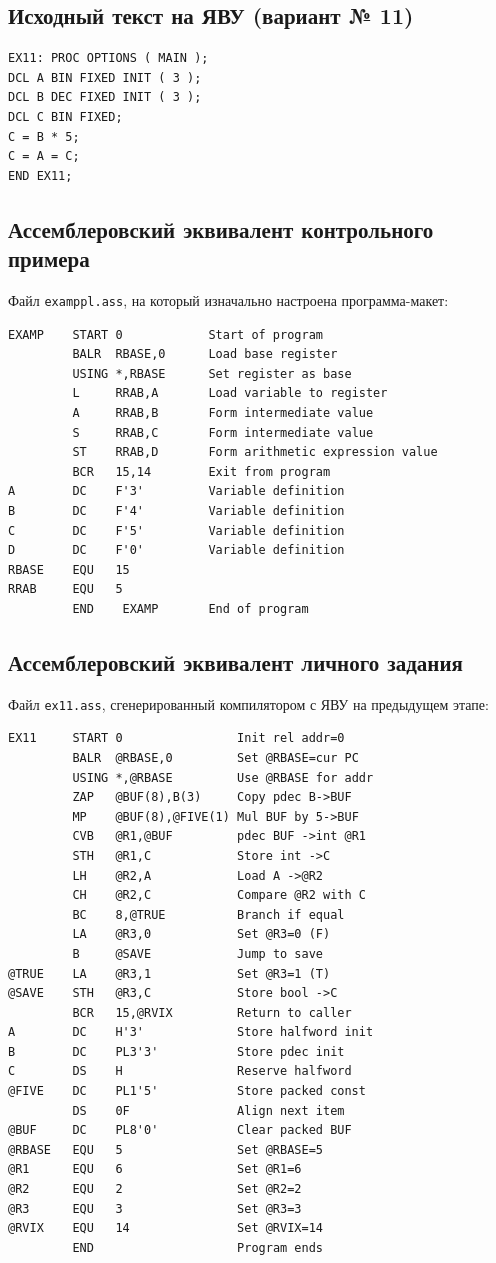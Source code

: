 \documentclass[12pt, a4paper]{article}
\begin{document}
\subsection{Исходный текст на ЯВУ (вариант № 11)}
\begin{lstlisting}[language=PL/I]
EX11: PROC OPTIONS ( MAIN );
DCL A BIN FIXED INIT ( 3 );
DCL B DEC FIXED INIT ( 3 );
DCL C BIN FIXED;
C = B * 5;
C = A = C;
END EX11;
\end{lstlisting}

\subsection{Ассемблеровский эквивалент контрольного примера}
Файл \texttt{examppl.ass}, на который изначально настроена программа-макет:
\begin{lstlisting}
EXAMP    START 0            Start of program
         BALR  RBASE,0      Load base register
         USING *,RBASE      Set register as base
         L     RRAB,A       Load variable to register
         A     RRAB,B       Form intermediate value
         S     RRAB,C       Form intermediate value
         ST    RRAB,D       Form arithmetic expression value
         BCR   15,14        Exit from program
A        DC    F'3'         Variable definition
B        DC    F'4'         Variable definition
C        DC    F'5'         Variable definition
D        DC    F'0'         Variable definition
RBASE    EQU   15
RRAB     EQU   5
         END    EXAMP       End of program
\end{lstlisting}

\subsection{Ассемблеровский эквивалент личного задания}
Файл \texttt{ex11.ass}, сгенерированный компилятором с ЯВУ на предыдущем этапе:
\begin{lstlisting}
EX11     START 0                Init rel addr=0
         BALR  @RBASE,0         Set @RBASE=cur PC
         USING *,@RBASE         Use @RBASE for addr
         ZAP   @BUF(8),B(3)     Copy pdec B->BUF
         MP    @BUF(8),@FIVE(1) Mul BUF by 5->BUF
         CVB   @R1,@BUF         pdec BUF ->int @R1
         STH   @R1,C            Store int ->C
         LH    @R2,A            Load A ->@R2
         CH    @R2,C            Compare @R2 with C
         BC    8,@TRUE          Branch if equal
         LA    @R3,0            Set @R3=0 (F)
         B     @SAVE            Jump to save
@TRUE    LA    @R3,1            Set @R3=1 (T)
@SAVE    STH   @R3,C            Store bool ->C
         BCR   15,@RVIX         Return to caller
A        DC    H'3'             Store halfword init
B        DC    PL3'3'           Store pdec init
C        DS    H                Reserve halfword
@FIVE    DC    PL1'5'           Store packed const
         DS    0F               Align next item
@BUF     DC    PL8'0'           Clear packed BUF
@RBASE   EQU   5                Set @RBASE=5
@R1      EQU   6                Set @R1=6
@R2      EQU   2                Set @R2=2
@R3      EQU   3                Set @R3=3
@RVIX    EQU   14               Set @RVIX=14
         END                    Program ends
\end{lstlisting}
\end{document}
